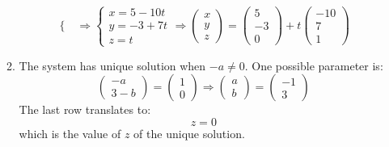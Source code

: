 \documentclass{article}
\begin{document}
\begin{enumerate}
\begin{enumerate}[label={(\roman*)}]
\[\begin{cases}
        \end{cases}
        \Rightarrow
        \begin{cases}
          x = 5 - 10t \\
          y = -3 + 7t \\
          z = t
        \end{cases}
        \Rightarrow
        \begin{pmatrix}
          x \\ y \\ z 
        \end{pmatrix}
        =
        \begin{pmatrix}
          5 \\ -3 \\ 0
        \end{pmatrix} +
        t
        \begin{pmatrix}
          -10 \\ 7 \\ 1
        \end{pmatrix}
      \]
    \item The system has unique solution when $-a \neq 0$. One possible parameter is:
      \[
        \begin{pmatrix}
          -a \\ 3 - b
        \end{pmatrix}
        = 
        \begin{pmatrix}
          1 \\ 0
        \end{pmatrix}
        \Rightarrow
        \begin{pmatrix}
          a \\ b
        \end{pmatrix}
        = 
        \begin{pmatrix}
          -1 \\ 3
        \end{pmatrix}
      \]
      The last row translates to:
      \[
        z = 0
      \]
      which is the value of $z$ of the unique solution.
  \end{enumerate}


\end{enumerate}
\end{document}
